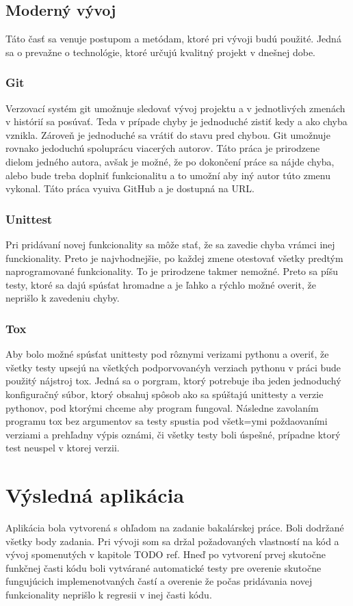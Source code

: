 \section{Moderný vývoj}
Táto časť sa venuje postupom a metódam, ktoré pri vývoji budú použité. Jedná sa
o prevažne o technológie, ktoré určujú kvalitný projekt v dnešnej dobe.

\subsection{Git}
Verzovací systém git umožnuje sledovať vývoj projektu a v jednotlivých zmenách
v histórií sa posúvať. Teda v prípade chyby je jednoduché zistiť kedy a ako chyba
vznikla. Zároveň je jednoduché sa vrátiť do stavu pred chybou.
Git umožnuje rovnako jedoduchú spoluprácu viacerých autorov. Táto práca je
prirodzene dielom jedného autora, avšak je možné, že po dokončení práce sa nájde
chyba, alebo bude treba doplniť funkcionalitu a to umožní aby iný autor túto zmenu
vykonal.
Táto práca vyuiva GitHub a je dostupná na URL.

\subsection{Unittest}
Pri pridávaní novej funkcionality sa môže stať, že sa zavedie chyba vrámci inej
funckionality. Preto je najvhodnejšie, po každej zmene otestovať všetky predtým
naprogramované funkcionality. To je prirodzene takmer nemožné. Preto sa píšu testy,
ktoré sa dajú spúsťat hromadne a je ľahko a rýchlo možné overit, že neprišlo k
zavedeniu chyby.

\subsection{Tox}
Aby bolo možné spúsťat unittesty pod rôznymi verizami pythonu a overiť, že všetky testy
upsejú na všetkých podporvovanćyh verziach pythonu v práci bude použitý nájstroj tox.
Jedná sa o porgram, ktorý potrebuje iba jeden jednoduchý konfiguračný súbor, ktorý
obsahuj spôsob ako sa spúštajú unittesty a verzie pythonov, pod ktorými chceme
aby program fungoval. Následne zavolaním programu tox bez argumentov sa testy
spustia pod všetk=ymi poždaovaními verziami a prehľadny výpis oznámi, či všetky
testy boli úspešné, prípadne ktorý test neuspel v ktorej verzii.

\chapter{Výsledná aplikácia}
Aplikácia bola vytvorená s ohľadom na zadanie bakalárskej práce. Boli dodržané všetky body zadania. Pri vývoji som sa držal požadovaných vlastností na kód a vývoj spomenutých v kapitole TODO ref. Hneď po vytvorení prvej skutočne funkčnej časti kódu boli vytvárané automatické testy pre overenie skutočne fungujúcich implemenotvaných častí a overenie že počas pridávania novej funkcionality neprišlo k regresii v inej časti kódu. 

